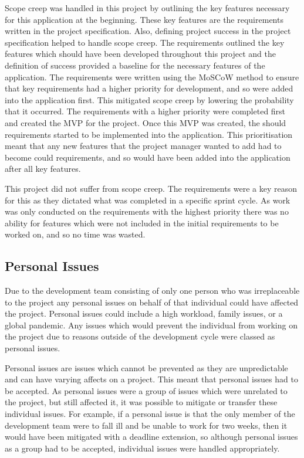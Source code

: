 \documentclass{article}
\begin{document}
Scope creep was handled in this project by outlining the key features necessary for this application at the beginning. These key features are the requirements written in the project specification. Also, defining project success in the project specification helped to handle scope creep. The requirements outlined the key features which should have been developed throughout this project and the definition of success provided a baseline for the necessary features of the application. The requirements were written using the MoSCoW method to ensure that key requirements had a higher priority for development, and so were added into the application first. This mitigated scope creep by lowering the probability that it occurred. The requirements with a higher priority were completed first and created the MVP for the project. Once this MVP was created, the should requirements started to be implemented into the application. This prioritisation meant that any new features that the project manager wanted to add had to become could requirements, and so would have been added into the application after all key features. \par

This project did not suffer from scope creep. The requirements were a key reason for this as they dictated what was completed in a specific sprint cycle. As work was only conducted on the requirements with the highest priority there was no ability for features which were not included in the initial requirements to be worked on, and so no time was wasted. \par

\subsection{Personal Issues}

Due to the development team consisting of only one person who was irreplaceable to the project any personal issues on behalf of that individual could have affected the project. Personal issues could include a high workload, family issues, or a global pandemic. Any issues which would prevent the individual from working on the project due to reasons outside of the development cycle were classed as personal issues. \par

Personal issues are issues which cannot be prevented as they are unpredictable and can have varying affects on a project. This meant that personal issues had to be accepted. As personal issues were a group of issues which were unrelated to the project, but still affected it, it was possible to mitigate or transfer these individual issues. For example, if a personal issue is that the only member of the development team were to fall ill and be unable to work for two weeks, then it would have been mitigated with a deadline extension, so although personal issues as a group had to be accepted, individual issues were handled appropriately. \par
\end{document}
